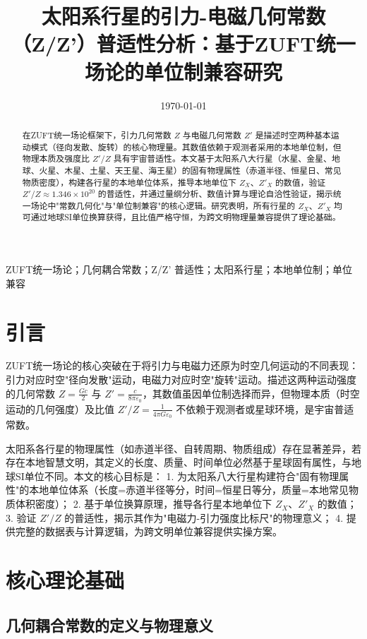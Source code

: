 \documentclass[a4paper, 12pt]{article}
\title{太阳系行星的引力-电磁几何常数（Z/Z'）普适性分析：基于ZUFT统一场论的单位制兼容研究}
\author{}
\date{\today}
\begin{document}
\maketitle

\begin{abstract}
在ZUFT统一场论框架下，引力几何常数 $Z$ 与电磁几何常数 $Z'$ 是描述时空两种基本运动模式（径向发散、旋转）的核心物理量。其数值依赖于观测者采用的本地单位制，但物理本质及强度比 $Z'/Z$ 具有宇宙普适性。本文基于太阳系八大行星（水星、金星、地球、火星、木星、土星、天王星、海王星）的固有物理属性（赤道半径、恒星日、常见物质密度），构建各行星的本地单位体系，推导本地单位下 $Z_X$、$Z'_X$ 的数值，验证 $Z'/Z \approx 1.346 \times 10^{20}$ 的普适性，并通过量纲分析、数值计算与理论自洽性验证，揭示统一场论中"常数几何化"与"单位制兼容"的核心逻辑。研究表明，所有行星的 $Z_X$、$Z'_X$ 均可通过地球SI单位换算获得，且比值严格守恒，为跨文明物理量兼容提供了理论基础。
\end{abstract}

\begin{keywords}
ZUFT统一场论；几何耦合常数；Z/Z' 普适性；太阳系行星；本地单位制；单位兼容
\end{keywords}

\section{引言}
ZUFT统一场论的核心突破在于将引力与电磁力还原为时空几何运动的不同表现：引力对应时空"径向发散"运动，电磁力对应时空"旋转"运动\cite{zhang2023unified}。描述这两种运动强度的几何常数 $Z = \frac{Gc}{2}$ 与 $Z' = \frac{c}{8\pi\varepsilon_0}$，其数值虽因单位制选择而异，但物理本质（时空运动的几何强度）及比值 $Z'/Z = \frac{1}{4\pi G\varepsilon_0}$ 不依赖于观测者或星球环境，是宇宙普适常数\cite{zhang2022symmetry}。

太阳系各行星的物理属性（如赤道半径、自转周期、物质组成）存在显著差异，若存在本地智慧文明，其定义的长度、质量、时间单位必然基于星球固有属性，与地球SI单位不同。本文的核心目标是：
1. 为太阳系八大行星构建符合"固有物理属性"的本地单位体系（长度=赤道半径等分，时间=恒星日等分，质量=本地常见物质体积密度）；
2. 基于单位换算原理，推导各行星本地单位下 $Z_X$、$Z'_X$ 的数值；
3. 验证 $Z'/Z$ 的普适性，揭示其作为"电磁力-引力强度比标尺"的物理意义；
4. 提供完整的数据表与计算逻辑，为跨文明单位兼容提供实操方案。

\section{核心理论基础}
\subsection{几何耦合常数的定义与物理意义}
\end{document}
